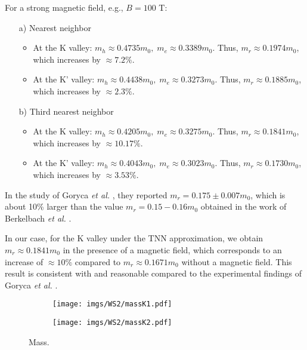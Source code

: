 \documentclass{article}
\begin{document}
For a strong magnetic field, e.g., $B = 100$ T:
\begin{itemize}
	\item[a)] Nearest neighbor
	      \begin{itemize}
		      \item At the K valley: $m_{h} \approx 0.4735 m_{0},\; m_{e} \approx 0.3389 m_{0}$. Thus, $m_{r} \approx 0.1974 m_{0}$, which increases by $\approx 7.2\%$.
		      \item At the K' valley: $m_{h} \approx 0.4438 m_{0},\; m_{e} \approx 0.3273 m_{0}$. Thus, $m_{r} \approx 0.1885 m_{0}$, which increases by $\approx 2.3\%$.
	      \end{itemize}
	\item[b)] Third nearest neighbor
	      \begin{itemize}
		      \item At the K valley: $m_{h} \approx 0.4205 m_{0},\; m_{e} \approx 0.3275 m_{0}$. Thus, $m_{r} \approx 0.1841 m_{0}$, which increases by $\approx 10.17\%$.
		      \item At the K' valley: $m_{h} \approx 0.4043 m_{0},\; m_{e} \approx 0.3023 m_{0}$. Thus, $m_{r} \approx 0.1730 m_{0}$, which increases by $\approx 3.53\%$.
	      \end{itemize}
\end{itemize}

In the study of Goryca \textit{et al.} \cite{goryca2019}, they reported $m_{r} = 0.175 \pm 0.007 m_{0}$, which is about 10\% larger than the value $m_{r} = 0.15 - 0.16 m_{0}$ obtained in the work of Berkelbach \textit{et al.} \cite{berkelbach2013}.

In our case, for the K valley under the TNN approximation, we obtain $m_{r} \approx 0.1841 m_{0}$ in the presence of a magnetic field, which corresponds to an increase of $\approx 10\%$ compared to $m_{r} \approx 0.1671 m_{0}$ without a magnetic field. This result is consistent with and reasonable compared to the experimental findings of Goryca \textit{et al.} \cite{goryca2019}.


\begin{figure}[htb]
	\begin{subfigure}{0.495\textwidth}
		\centering
		\texttt{[image: imgs/WS2/massK1.pdf]}
	\end{subfigure}
	\begin{subfigure}{0.495\textwidth}
		\centering
		\texttt{[image: imgs/WS2/massK2.pdf]}
	\end{subfigure}
	\caption{Mass.}
\end{figure}
\newpage
\end{document}
